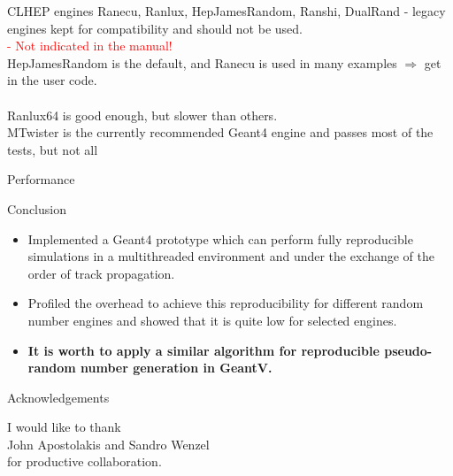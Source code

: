 \documentclass[aspectratio=169, 14pt]{beamer}
\begin{document}
\begin{large}
 \begin{frame}{CLHEP engines}
    Ranecu, Ranlux, HepJamesRandom, Ranshi, DualRand - legacy engines kept for compatibility and should not be used.
    \\ \textcolor{red}{ - Not indicated in the manual!}\\
    HepJamesRandom is the default, and Ranecu is used in many examples $\Rightarrow$ get in the user code.\\ \ \\
    Ranlux64 is good enough, but slower than others.\\
    MTwister is the currently recommended Geant4 engine and passes most of the tests, but not all
 \end{frame}
 
 
 \begin{frame}{Performance}
  \begin{figure}
   \begin{subfloat}[][]
    \centering
    \scalebox{.33}{}  
   \end{subfloat}
   \begin{subfloat}[][]
    \centering
    \scalebox{.33}{}  
    \label{fig:B}
   \end{subfloat}
  \end{figure}
 \end{frame}

 
 \begin{frame}{Conclusion}
  \begin{itemize}
   \item Implemented a Geant4 prototype which can perform fully reproducible simulations in a multithreaded environment and under the exchange of the order of track propagation.
   \item Profiled the overhead to achieve this reproducibility for different random number engines and showed that it is quite low for selected engines.
  
   \item \bf It is worth to apply a similar algorithm for reproducible pseudo-random number generation in GeantV.
  \end{itemize}

 \end{frame}
 
 \begin{frame}{Acknowledgements}

  \centering
  I would like to thank\\
  John Apostolakis and Sandro Wenzel\\
  for productive collaboration. 

 \end{frame}
 
 
 \appendix
 
 \end{large}
\end{document}
